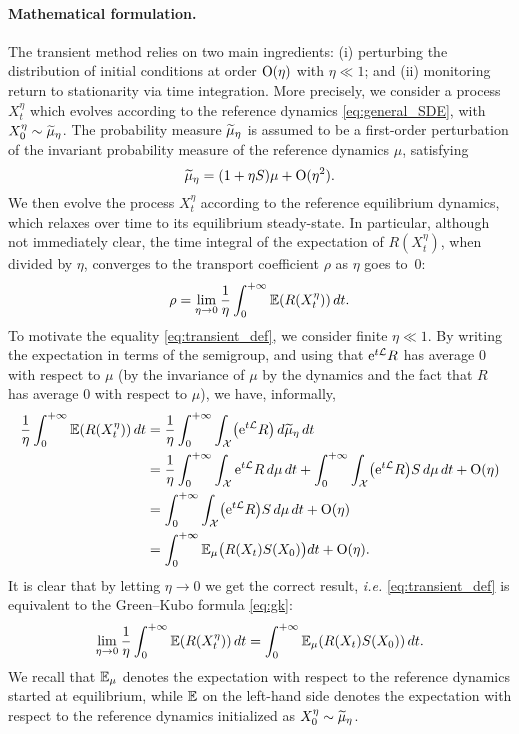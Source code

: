 \paragraph{Mathematical formulation.} The transient method relies on two main ingredients: (i) perturbing the distribution of initial conditions at order $\mathrm{O}(\eta)$ with $\eta\ll 1$; and (ii) monitoring return to stationarity via time integration. More precisely, we consider a process $X_t^\eta$ which evolves according to the reference dynamics \eqref{eq:general_SDE}, with $X_0^\eta \sim \widetilde{\mu}_\eta$. The probability measure $\widetilde{\mu}_\eta$ is assumed to be a first-order perturbation of the invariant probability measure of the reference dynamics $\mu$, satisfying
%
\begin{equation}
	\widetilde{\mu}_\eta = (1+\eta S)\mu + \mathrm{O}(\eta^2).
	\label{eq:init_dist}
\end{equation}
%
We then evolve the process $X_t^\eta$ according to the reference equilibrium dynamics, which relaxes over time to its equilibrium steady-state. In particular, although not immediately clear, the time integral of the expectation of $R(X_t^\eta)$, when divided by $\eta$, converges to the transport coefficient $\rho$ as $\eta$ goes to~$0$:
%
\begin{equation}
	\rho = \lim_{\eta\to 0} \frac{1}{\eta}\int_0^{+\infty} \mathbb{E}(R(X_t^\eta)) \, dt.
	\label{eq:transient_def}
\end{equation}
%
To motivate the equality \eqref{eq:transient_def}, we consider finite $\eta\ll 1$. By writing the expectation in terms of the semigroup, and using that $\mathrm{e}^{t\mathcal{L}}R$ has average 0 with respect to $\mu$ (by the invariance of $\mu$ by the dynamics and the fact that $R$ has average 0 with respect to $\mu$), we have, informally,
%
%
\begin{align}
    \label{eq:gk_equiv1}
	\frac{1}{\eta}\int_0^{+\infty} \mathbb{E}(R(X_t^\eta)) \, dt &= \frac{1}{\eta} \int_0^{+\infty} \int_\mathcal{X} \bigl(\mathrm{e}^{t\mathcal{L}} R\bigr) \, d\widetilde{\mu}_\eta \, dt \\
	&= \frac{1}{\eta}\int_0^{+\infty} \int_\mathcal{X} \mathrm{e}^{t\mathcal{L}} R \, d\mu \, dt + \int_0^{+\infty} \int_\mathcal{X} \bigl(\mathrm{e}^{t\mathcal{L}} R\bigr) S \, d\mu \, dt + \mathrm{O}(\eta) \\
	&= \int_0^{+\infty} \int_\mathcal{X} \bigl(\mathrm{e}^{t\mathcal{L}} R\bigr) S \, d\mu \, dt + \mathrm{O}(\eta) \\
	&= \int_0^{+\infty} \mathbb{E}_\mu\bigl(R(X_t)S(X_0)\bigr) dt + \mathrm{O}(\eta).
    \label{eq:gk_equiv2}
\end{align}
%
It is clear that by letting $\eta\to 0$ we get the correct result, \emph{i.e.} \eqref{eq:transient_def} is equivalent to the Green--Kubo formula \eqref{eq:gk}:
%
\begin{equation}
	\lim_{\eta\to 0}\frac{1}{\eta}\int_0^{+\infty} \mathbb{E}(R(X_t^\eta)) \, dt = \int_0^{+\infty} \mathbb{E}_\mu(R(X_t) S(X_0)) \, dt.
	\label{eq:td_gk}
\end{equation}
%
We recall that $\mathbb{E}_\mu$ denotes the expectation with respect to the reference dynamics started at equilibrium, while $\mathbb{E}$ on the left-hand side denotes the expectation with respect to the reference dynamics initialized as $X_0^\eta \sim \widetilde{\mu}_\eta$.

